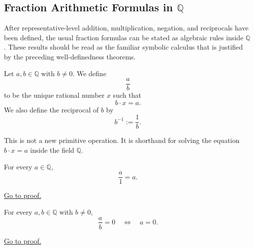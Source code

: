 
\subsection*{\texorpdfstring{Fraction Arithmetic Formulas in $\mathbb{Q}$}{Fraction Arithmetic Formulas in Q}}
\label{sec:fraction-arithmetic-formulas-q}

\begin{exposition}
After representative-level addition, multiplication, negation, and reciprocals have been defined, the usual fraction formulas can be stated as algebraic rules inside $\mathbb{Q}$.  These results should be read as the familiar symbolic calculus that is justified by the preceding well-definedness theorems.
\end{exposition}

\begin{definition}
\label{def:rational-division}
Let $a,b\in \mathbb{Q}$ with $b\neq 0$. We define
\[
\frac{a}{b}
\]
to be the unique rational number $x$ such that
\[
b\cdot x=a.
\]
We also define the reciprocal of $b$ by
\[
b^{-1}:=\frac{1}{b}.
\]
\end{definition}

\begin{remark*}
This is not a new primitive operation. It is shorthand for solving the
equation $b\cdot x=a$ inside the field $\mathbb{Q}$.
\end{remark*}

\begin{theorem}
\label{thm:rational-division-by-one}
For every $a\in\mathbb{Q}$,
\[
\frac{a}{1}=a.
\]
\end{theorem}

\begin{remark*}[Proof]
\hyperref[prf:rational-division-by-one]{Go to proof.}
\end{remark*}

\begin{theorem}
\label{thm:rational-quotient-zero-iff-numerator-zero}
For every $a,b\in\mathbb{Q}$ with $b\neq 0$,
\[
\frac{a}{b}=0
\quad\Longleftrightarrow\quad
a=0.
\]
\end{theorem}

\begin{remark*}[Proof]
\hyperref[prf:rational-quotient-zero-iff-numerator-zero]{Go to proof.}
\end{remark*}

